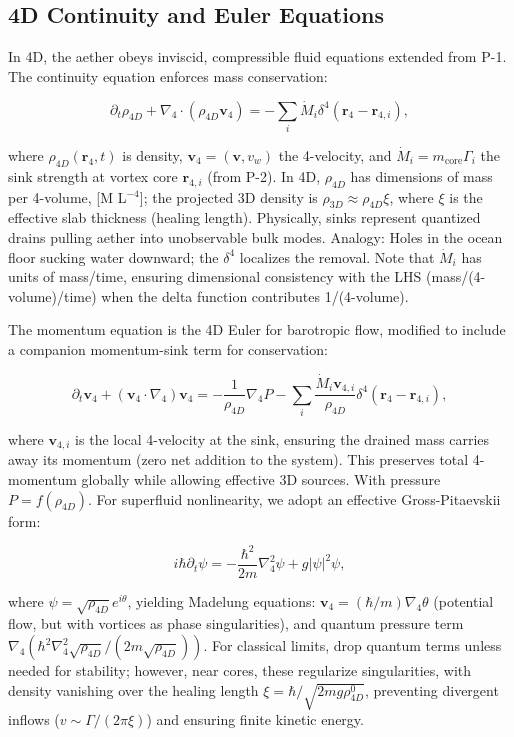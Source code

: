 \documentclass{article}
\begin{document}
\subsection{4D Continuity and Euler Equations}

In 4D, the aether obeys inviscid, compressible fluid equations extended from P-1. The continuity equation enforces mass conservation:

\[
\partial_t \rho_{4D} + \nabla_4 \cdot (\rho_{4D} \mathbf{v}_4) = -\sum_i \dot{M}_i \delta^4(\mathbf{r}_4 - \mathbf{r}_{4,i}),
\]

where $\rho_{4D}(\mathbf{r}_4, t)$ is density, $\mathbf{v}_4 = (\mathbf{v}, v_w)$ the 4-velocity, and $\dot{M}_i = m_{\text{core}} \Gamma_i$ the sink strength at vortex core $\mathbf{r}_{4,i}$ (from P-2). In 4D, $\rho_{4D}$ has dimensions of mass per 4-volume, [M L$^{-4}$]; the projected 3D density is $\rho_{3D} \approx \rho_{4D} \xi$, where $\xi$ is the effective slab thickness (healing length). Physically, sinks represent quantized drains pulling aether into unobservable bulk modes. Analogy: Holes in the ocean floor sucking water downward; the $\delta^4$ localizes the removal. Note that $\dot{M}_i$ has units of mass/time, ensuring dimensional consistency with the LHS (mass/(4-volume)/time) when the delta function contributes 1/(4-volume).

The momentum equation is the 4D Euler for barotropic flow, modified to include a companion momentum-sink term for conservation:

\[
\partial_t \mathbf{v}_4 + (\mathbf{v}_4 \cdot \nabla_4) \mathbf{v}_4 = -\frac{1}{\rho_{4D}} \nabla_4 P - \sum_i \frac{\dot{M}_i \mathbf{v}_{4,i}}{\rho_{4D}} \delta^4(\mathbf{r}_4 - \mathbf{r}_{4,i}),
\]

where $\mathbf{v}_{4,i}$ is the local 4-velocity at the sink, ensuring the drained mass carries away its momentum (zero net addition to the system). This preserves total 4-momentum globally while allowing effective 3D sources. With pressure $P = f(\rho_{4D})$. For superfluid nonlinearity, we adopt an effective Gross-Pitaevskii form:

\[
i \hbar \partial_t \psi = -\frac{\hbar^2}{2 m} \nabla_4^2 \psi + g |\psi|^2 \psi,
\]

where $\psi = \sqrt{\rho_{4D}} e^{i \theta}$, yielding Madelung equations: $\mathbf{v}_4 = (\hbar / m) \nabla_4 \theta$ (potential flow, but with vortices as phase singularities), and quantum pressure term $\nabla_4 (\hbar^2 \nabla_4^2 \sqrt{\rho_{4D}} / (2 m \sqrt{\rho_{4D}}))$. For classical limits, drop quantum terms unless needed for stability; however, near cores, these regularize singularities, with density vanishing over the healing length $\xi = \hbar / \sqrt{2 m g \rho_{4D}^0}$, preventing divergent inflows ($v \sim \Gamma / (2\pi \xi)$) and ensuring finite kinetic energy.
\end{document}
